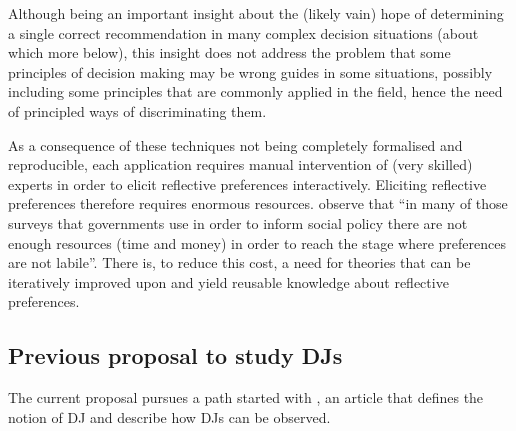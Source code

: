\documentclass[version=last, pagesize, twoside=off, bibliography=totoc, DIV=calc, fontsize=12pt, a4paper, french, english]{scrartcl}
\begin{document}
Although being an important insight about the (likely vain) hope of determining a single correct recommendation in many complex decision situations (about which more below), this insight does not address the problem that some principles of decision making may be wrong guides in some situations, possibly including some principles that are commonly applied in the field, hence the need of principled ways of discriminating them. 

As a consequence of these techniques not being completely formalised and reproducible, each application requires manual intervention of (very skilled) experts in order to elicit reflective preferences interactively. Eliciting reflective preferences therefore requires enormous resources.  observe that “in many of those surveys that governments use in order to inform social policy there are not enough resources (time and money) in order to reach the stage where preferences are not labile”. There is, to reduce this cost, a need for theories that can be iteratively improved upon and yield reusable knowledge about reflective preferences. 

\subsection{Previous proposal to study \aclp{DJ}}
The current proposal pursues a path started with \citet{cailloux_formal_2019}, an article that defines the notion of \ac{DJ} and describe how \acp{DJ} can be observed. 
\end{document}
